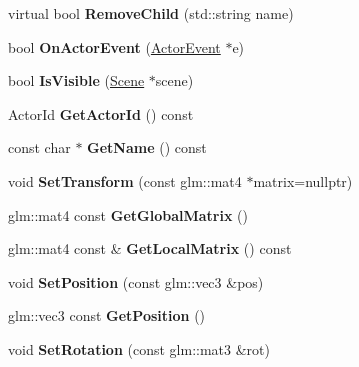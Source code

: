\begin{DoxyCompactItemize}
virtual bool {\bfseries Remove\+Child} (std\+::string name)
\item 
\mbox{\label{classTarbora_1_1SceneNode_aae5ec8f2f877f79aeec32264c08acf23}} 
bool {\bfseries On\+Actor\+Event} (\hyperlink{structTarbora_1_1ActorEvent}{Actor\+Event} $\ast$e)
\item 
\mbox{\label{classTarbora_1_1SceneNode_a02c5943ff54794c5db8ea1f644d3ddc2}} 
bool {\bfseries Is\+Visible} (\hyperlink{classTarbora_1_1Scene}{Scene} $\ast$scene)
\item 
\mbox{\label{classTarbora_1_1SceneNode_a377a382bd929d0c8d1bc56c147826613}} 
Actor\+Id {\bfseries Get\+Actor\+Id} () const
\item 
\mbox{\label{classTarbora_1_1SceneNode_a5f89f19eed21c23d2adf7ccad61fef3b}} 
const char $\ast$ {\bfseries Get\+Name} () const
\item 
\mbox{\label{classTarbora_1_1SceneNode_afd058c0d9c36ba5aa725c19b98d8d028}} 
void {\bfseries Set\+Transform} (const glm\+::mat4 $\ast$matrix=nullptr)
\item 
\mbox{\label{classTarbora_1_1SceneNode_a2f2e4ae74676c05aceebdd485384470f}} 
glm\+::mat4 const {\bfseries Get\+Global\+Matrix} ()
\item 
\mbox{\label{classTarbora_1_1SceneNode_ad1c47c225fa3183c970e0ea1486c0371}} 
glm\+::mat4 const  \& {\bfseries Get\+Local\+Matrix} () const
\item 
\mbox{\label{classTarbora_1_1SceneNode_add1d5ca10356cfd357b913278a30b959}} 
void {\bfseries Set\+Position} (const glm\+::vec3 \&pos)
\item 
\mbox{\label{classTarbora_1_1SceneNode_aaa5e7733bdf51cc576c3c5f92ab02ce8}} 
glm\+::vec3 const {\bfseries Get\+Position} ()
\item 
\mbox{\label{classTarbora_1_1SceneNode_a797c13e0742b96f7905ee2b3c40e5437}} 
void {\bfseries Set\+Rotation} (const glm\+::mat3 \&rot)

\end{DoxyCompactItemize}
